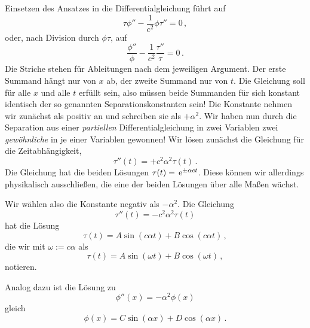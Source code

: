 \documentclass[paper=a4, fontsize=11.0pt, abstractoff, DIV12]{scrartcl}
\begin{document}
Einsetzen des Ansatzes in die Differentialgleichung führt auf
\begin{equation}
\tau \phi'' - \frac{1}{c^2}\phi \tau'' = 0\,,
\end{equation}
oder, nach Division durch $\phi\tau$, auf
\begin{equation}
\frac{\phi''}{\phi} - \frac{1}{c^2}\frac{\tau''}{\tau} = 0\,.
\label{eq:WGL}
\end{equation}
Die Striche stehen für Ableitungen nach dem jeweiligen Argument. Der erste
Summand hängt nur von $x$ ab, der zweite Summand nur von $t$. Die Gleichung
soll für alle $x$ und alle $t$ erfüllt sein, also müssen beide Summanden für
sich konstant identisch der so genannten Separationskonstanten sein! Die
Konstante nehmen wir zunächst als positiv an und schreiben sie als
$+\alpha^2$. Wir haben nun durch die Separation aus einer \emph{partiellen}
Differentialgleichung in zwei Variablen zwei \emph{gewöhnliche} in je einer
Variablen gewonnen! Wir lösen zunächst die Gleichung für die Zeitabhängigkeit,
\begin{equation}
\tau''(t) = +{c^2}{\alpha^2}\tau(t)\,.
\end{equation}
Die Gleichung hat die beiden Lösungen $\tau(t) = \,{\mathrm{e}}^{\pm \alpha c t}$. Diese können wir allerdings physikalisch ausschließen, die eine der beiden Lösungen
über alle Maßen wächst.

Wir wählen also die Konstante negativ als $-\alpha^2$.
Die Gleichung
\begin{equation}
\tau''(t) = -{c^2}{\alpha^2}\tau(t)
\end{equation}
hat die Lösung
\begin{equation*}
\tau(t) = A\sin\left({c}{\alpha} t\right) + B\cos\left({c}{\alpha} t\right)\,,
\end{equation*}
die wir mit $\omega := {c}{\alpha}$ als
\begin{equation}
\tau(t) = A\sin\left(\omega t\right) + B\cos\left(\omega t\right)\,,
\end{equation}
notieren.

Analog dazu ist die Lösung zu
\begin{equation}
\phi''(x) = -\alpha^2\phi(x)
\end{equation}
gleich
\begin{equation}
\phi(x) = C\sin\left({\alpha} x\right) + D\cos\left({\alpha} x\right)\,.
\end{equation}
\end{document}
